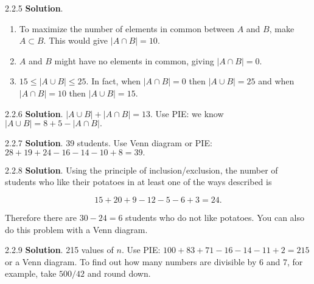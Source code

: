 \documentclass[11pt,]{book}
\theoremstyle{ptxplainnotitle}
\theoremstyle{ptxplaintitle}
\theoremstyle{ptxdefinitionnotitle}
\theoremstyle{ptxdefinitiontitle}
\theoremstyle{ptxdefinitionnotitle}
\theoremstyle{ptxdefinitiontitle}
\theoremstyle{ptxdefinitionnotitle}
\theoremstyle{ptxdefinitiontitle}
\theoremstyle{ptxdefinitiontitlenonumber}
\theoremstyle{ptxdefinitiontitlenonumber}
\numberwithin{equation}{chapter}
\newcommand{\card}[1]{\left| #1 \right|}
\begin{document}
\begin{divisionexercise}{2.2.5}
\textbf{Solution}.\quad%
\hypertarget{p-1100}{}%
\leavevmode%
\begin{enumerate}[label=\alph*.]
\item\hypertarget{li-485}{}\hypertarget{p-1101}{}%
To maximize the number of elements in common between \(A\) and \(B\text{,}\) make \(A \subset B\text{.}\)  This would give \(\card{A \cap B} = 10\text{.}\)%
\item\hypertarget{li-486}{}\hypertarget{p-1102}{}%
\(A\) and \(B\) might have no elements in common, giving \(\card{A\cap B} = 0\text{.}\)%
\item\hypertarget{li-487}{}\hypertarget{p-1103}{}%
\(15 \le \card{A \cup B} \le 25\text{.}\)  In fact, when \(\card{A \cap B} = 0\) then \(\card{A \cup B} = 25\) and when \(\card{A \cap B} = 10\) then \(\card{A \cup B} = 15\text{.}\)%
\end{enumerate}
%
\end{divisionexercise}%
\begin{divisionexercise}{2.2.6}
\textbf{Solution}.\quad%
\hypertarget{p-1109}{}%
\(\card{A \cup B} + \card{A \cap B} = 13\text{.}\)  Use PIE: we know \(\card{A \cup B} = 8 + 5 - \card{A \cap B}\text{.}\)%
\end{divisionexercise}%
\begin{divisionexercise}{2.2.7}
\textbf{Solution}.\quad%
\hypertarget{p-1115}{}%
39 students.  Use Venn diagram or PIE: \(28 + 19 + 24 - 16 - 14 - 10 + 8 = 39\text{.}\)%
\end{divisionexercise}%
\begin{divisionexercise}{2.2.8}
\textbf{Solution}.\quad%
\hypertarget{p-1122}{}%
Using the principle of inclusion/exclusion, the number of students who like their potatoes in at least one of the ways described is%
\par
\hypertarget{p-1123}{}%
%
\begin{equation*}
15 + 20 + 9 - 12 - 5 - 6 + 3 = 24.
\end{equation*}
%
\par
\hypertarget{p-1124}{}%
Therefore there are \(30-24 = 6\) students who do not like potatoes. You can also do this problem with a Venn diagram.%
\end{divisionexercise}%
\begin{divisionexercise}{2.2.9}
\textbf{Solution}.\quad%
\hypertarget{p-1132}{}%
215 values of \(n\text{.}\) Use PIE: \(100 + 83 + 71 - 16 - 14 -11 + 2 = 215\) or a Venn diagram. To find out how many numbers are divisible by 6 and 7, for example, take \(500/42\) and round down.%
\end{divisionexercise}%
\end{document}
